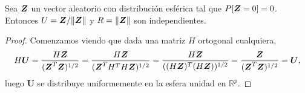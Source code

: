 \begin{nprop}
  Sea $\boldsymbol{Z}$ un vector aleatorio con distribución esférica tal que $P[\boldsymbol{Z} = 0] = 0$. Entonces $U = \boldsymbol{Z}/\Vert\boldsymbol{Z}\Vert$ y $R = \Vert\boldsymbol{Z}\Vert$ son independientes.
\end{nprop}

\begin{proof}
  Comenzamos viendo que dada una matriz $H$ ortogonal cualquiera,
  \begin{align*}
    H\boldsymbol U = \frac{H\boldsymbol{Z}}{(\boldsymbol{Z}^T\boldsymbol{Z})^{1/2}}
      = \frac{H\boldsymbol{Z}}{(\boldsymbol{Z}^TH^TH\boldsymbol{Z})^{1/2}}
      = \frac{H\boldsymbol{Z}}{((H\boldsymbol{Z})^T(H\boldsymbol{Z}))^{1/2}}
      = \frac{\boldsymbol{Z}}{(\boldsymbol{Z}^T\boldsymbol{Z})^{1/2}}
      = \boldsymbol U,
  \end{align*} luego $\boldsymbol U$ se distribuye uniformemente en la esfera unidad en $\mathbb R^p$.


\end{proof}
